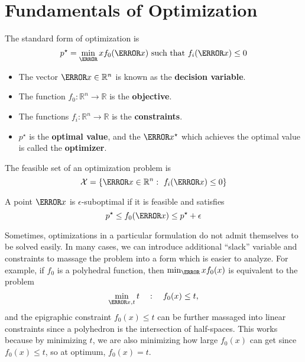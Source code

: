 \section{Fundamentals of Optimization}
\begin{definition}
	The standard form of optimization is \[
		p^\star = \min_\V{x} f_0(\V{x}) \text{ such that } f_i(\V{x}) \leq 0
	\]
	\label{defn:optimization}
\end{definition}
\begin{itemize}
	\item The vector $\V{x}\in\mathbb{R}^n$ is known as the \textbf{decision variable}.
	\item The function $f_0:\mathbb{R}^n\to\mathbb{R}$ is the \textbf{objective}.
	\item The functions $f_i:\mathbb{R}^n\to\mathbb{R}$ is the \textbf{constraints}.
	\item $p^\star$ is the \textbf{optimal value}, and the $\V{x}^\star$ which achieves the optimal value is called the \textbf{optimizer}.
\end{itemize}
\begin{definition}
	The feasible set of an  optimization problem is \[
		\mathcal{X} = \{\V{x}\in\mathbb{R}^n:\ f_i(\V{x}) \leq 0 \}
	\]
	\label{defn:feasible-set}
\end{definition}
\begin{definition}
	A point $\V{x}$ is $\epsilon$-suboptimal if it is feasible and satisfies \[
		p^\star \leq f_0(\V{x}) \leq p^\star + \epsilon
	\]
	\label{defn:suboptimal}
\end{definition}
Sometimes, optimizations in a particular formulation do not admit themselves to be solved easily.
In many cases, we can introduce additional ``slack'' variable and constraints to massage the problem into a form which is easier to analyze.
For example, if $f_0$ is a polyhedral function, then $\min_\V{x} f_0(x)$ is equivalent to the problem
\[
	\min_{\V{x}, t} t \quad : \quad f_0(x) \leq t,
\]
and the epigraphic constraint $f_0(x) \leq t$ can be further massaged into linear constraints since a polyhedron is the intersection of half-spaces.
This works because by minimizing $t$, we are also minimizing how large $f_0(x)$ can get since $f_0(x) \leq t$, so at optimum, $f_0(x) = t$.
